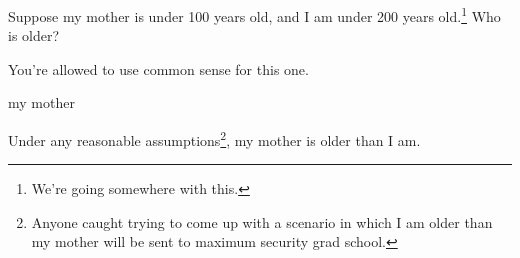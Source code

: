 
\begin{question}\label{prob_s1.11:mom}
Suppose my mother is under 100 years old, and I am under 200 years old.\footnote{We're going somewhere with this.} Who is older?
\end{question}
\begin{hint}
You're allowed to use common sense for this one.
\end{hint}
\begin{answer}
my mother
\end{answer}
\begin{solution}
Under any reasonable assumptions\footnote{Anyone caught trying to come up with a scenario in which I am older than my mother will be sent to maximum security grad school.}, my mother is older than I am.
\end{solution}


